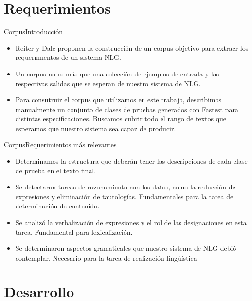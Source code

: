 \documentclass{beamer}
\begin{document}
\section{Requerimientos}
\begin{frame}{Corpus}{Introducción}
  \begin{itemize}
    \item Reiter y Dale proponen la construcción de un corpus objetivo para extraer los requerimientos de un sistema NLG.
    \item Un corpus no es más que una colección de ejemplos de entrada y las respectivas salidas que se esperan de nuestro sistema de NLG. 
    \item Para consutruir el corpus que utilizamos en este trabajo, describimos manualmente un conjunto de clases de pruebas generados con Fastest para distintas especificaciones. Buscamos cubrir todo el rango de textos que esperamos que nuestro sistema sea capaz de producir.
  \end{itemize}
\end{frame}
                                
\begin{frame}{Corpus}{Requerimientos más relevantes}
  \begin{itemize}
    \item Determinamos la estructura que deberán tener las descripciones de cada clase de prueba en el texto final.
    \item Se detectaron tareas de razonamiento con los datos, como la reducción de expresiones y eliminación de tautologías. Fundamentales para la tarea de determinación de contenido.
    \item Se analizó la verbalización de expresiones y el rol de las designaciones en esta tarea. Fundamental para lexicalización.
    \item Se determinaron aspectos gramaticales que nuestro sistema de NLG debió contemplar. Necesario para la tarea de realización lingüística.
  \end{itemize}
\end{frame}
                                
\section{Desarrollo}
                                
\end{document}
